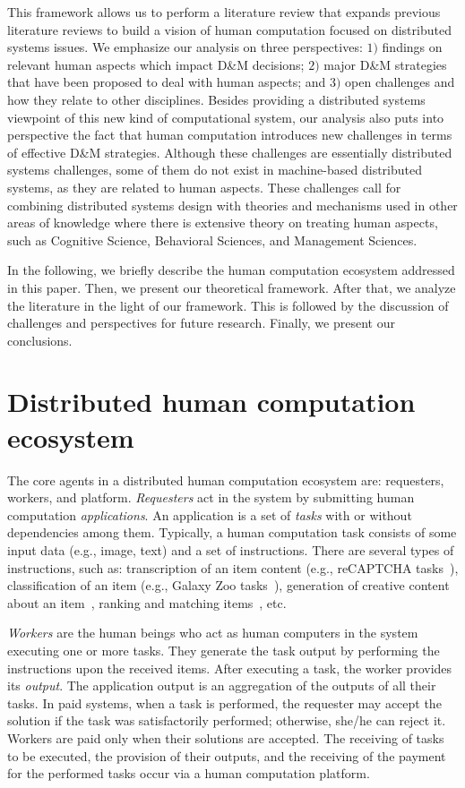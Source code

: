 \documentclass[11pt]{bmc_article_s50}
\begin{document}
This framework allows us to perform a literature review that expands previous literature reviews to build a vision of human computation focused on distributed systems issues. We emphasize our analysis on three perspectives: $1)$ findings on relevant human aspects which impact D\&M decisions; $2)$ major D\&M strategies that have been proposed to deal with human aspects; and $3)$ open challenges and how they relate to other disciplines. Besides providing a distributed systems viewpoint of this new kind of computational system, our analysis also puts into perspective the fact that human computation introduces new challenges in terms of effective D\&M strategies. Although these challenges are essentially distributed systems challenges, some of them do not exist in machine-based distributed systems, as they are related to human aspects. These challenges call for combining distributed systems design with theories and mechanisms used in other areas of knowledge where there is extensive theory on treating human aspects, such as Cognitive Science, Behavioral Sciences, and Management Sciences.

In the following, we briefly describe the human computation ecosystem addressed in this paper. Then, we present our theoretical framework.  After that, we analyze the literature in the light of our framework. This is followed by the discussion of challenges and perspectives for future research. Finally, we present our conclusions.

\section{Distributed human computation ecosystem}
\label{sec:bgrw}

The core agents in a distributed human computation ecosystem are: requesters, workers, and platform. \textit{Requesters} act in the system by submitting human computation \textit{applications}. An application is a set of \textit{tasks} with or without dependencies among them. Typically, a human computation task consists of some input data (e.g., image, text) and a set of instructions. There are several types of instructions, such as: transcription of an item content (e.g., reCAPTCHA tasks~\cite{von:Science:2008}), classification of an item (e.g., Galaxy Zoo tasks~\cite{Lintott:2008}), generation of creative content about an item~\cite{Araujo:2013}, ranking and matching items~\cite{Marcus:2011}, etc.

\textit{Workers} are the human beings who act as human computers in the system executing one or more tasks. They generate the task output by performing the instructions upon the received items. After executing a task, the worker provides its \textit{output}. The application output is an aggregation of the outputs of all their tasks. In paid systems, when a task is performed, the requester may accept the solution if the task was satisfactorily performed; otherwise, she/he can reject it. Workers are paid only when their solutions are accepted. The receiving of tasks to be executed, the provision of their outputs, and the receiving of the payment for the performed tasks occur via a human computation platform.
\end{document}
